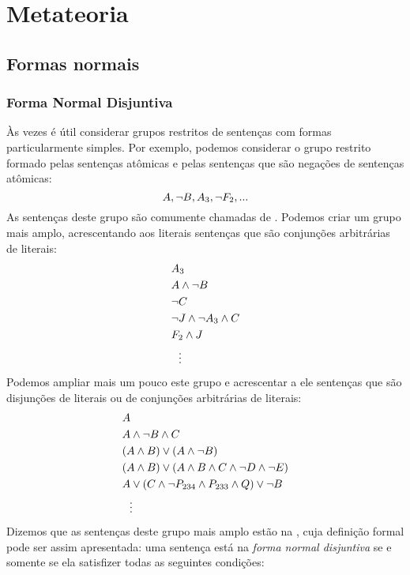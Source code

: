 \part{Metateoria}
\label{ch.normalform}

\chapter{Formas normais}


\section{Forma Normal Disjuntiva}\label{s:DNFDefined}

Às vezes é útil considerar grupos restritos de sentenças com formas particularmente simples.
Por exemplo, podemos considerar o grupo restrito formado pelas sentenças atômicas e pelas sentenças que são negações de sentenças atômicas:
$$A, \neg B, A_3, \neg F_2, ...$$
As sentenças deste grupo  são comumente chamadas de .
Podemos criar um grupo mais amplo, acrescentando aos literais sentenças que são conjunções arbitrárias de literais:
	\begin{align*}
			& A_3 \\
			& A \wedge \neg B \\
			& \neg C \\
			& \neg J \wedge \neg A_3 \wedge  C \\
			& F_2 \wedge  J \\
			& \ \ \vdots
	\end{align*}
Podemos ampliar mais um pouco este grupo e acrescentar a ele sentenças que são disjunções de literais ou de conjunções arbitrárias de literais:
	\begin{align*}
  		& A \\
  		& A \wedge \lnot B \wedge C\\
  		& (A \wedge B) \vee (A \wedge \neg B)\\
  		& (A \wedge B) \vee (A \wedge  B \wedge C \wedge \neg D \wedge \neg E)\\
  		& A \vee (C \wedge \neg P_{234} \wedge P_{233} \wedge Q) \vee \neg B\\
  		& \ \ \vdots
	\end{align*}
Dizemos que as sentenças deste grupo mais amplo estão na , cuja definição formal pode ser assim apresentada:
uma sentença está na \textit{forma normal disjuntiva} se e somente se ela satisfizer todas as seguintes condições:
